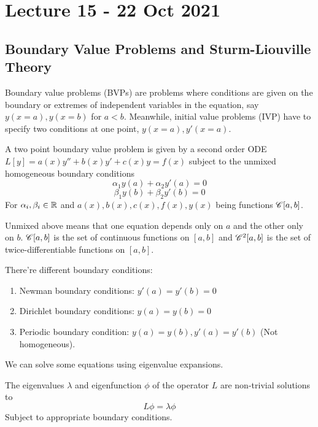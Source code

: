 \section{Lecture 15 - 22 Oct 2021}
\subsection{Boundary Value Problems and Sturm-Liouville Theory}
Boundary value problems (BVPs) are problems where conditions are given on the boundary or
extremes of independent variables in the equation, say $y(x=a),y(x=b)$ for $a<b$. Meanwhile, initial value
problems (IVP) have to specify two conditions at one point, $y(x=a), y'(x=a)$.
\begin{definition}
  A two point boundary value problem is given by a second order ODE
  $L[y]=a(x)y''+b(x)y'+c(x)y=f(x)$ subject to the unmixed homogeneous boundary conditions
  \[\alpha_1 y(a) + \alpha_2 y'(a)=0\]
  \[\beta_1 y(b) + \beta_2 y'(b)=0\]
  For $\alpha_i,\beta_i\in\mathbb R$ and $a(x),b(x),c(x),f(x),y(x)$ being functions $\mathscr C [a,b]$.
  \label{<+label+>}
\end{definition}

Unmixed above means that one equation depends only on $a$ and the other only on $b$.
$\mathscr C [a,b]$ is the set of continuous functions on $[a,b]$ and $\mathscr C^2 [a,b]$ is the set
of twice-differentiable functions on $[a,b]$.

There're different boundary conditions:
\begin{enumerate}
  \item Newman boundary conditions: $y'(a)=y'(b)=0$
  \item Dirichlet boundary conditions: $y(a)=y(b)=0$
  \item Periodic boundary condition: $y(a)=y(b), y'(a)=y'(b)$ (Not homogeneous).
\end{enumerate}

We can solve some equations using eigenvalue expansions.
\begin{definition}
  The eigenvalues $\lambda$ and eigenfunction $\phi$ of the operator $L$ are non-trivial
  solutions to 
  \[L\phi = \lambda\phi\]
  Subject to appropriate boundary conditions.
  \label{def:eigenFun}
\end{definition}

